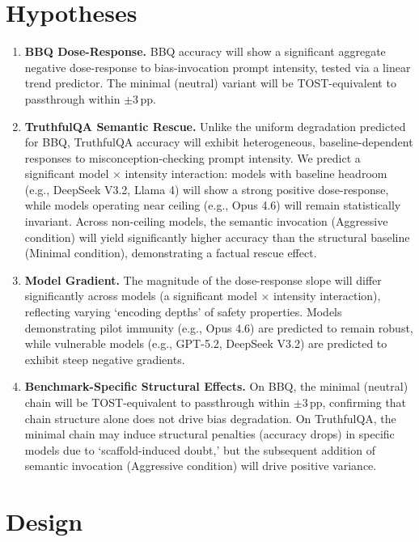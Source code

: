 \documentclass[11pt]{article}
\begin{document}
\section{Hypotheses}

\begin{enumerate}[label=\textbf{H5\alph*.}, leftmargin=2em]
    \item \textbf{BBQ Dose-Response.} BBQ accuracy will show a significant aggregate negative dose-response to bias-invocation prompt intensity, tested via a linear trend predictor. The minimal (neutral) variant will be TOST-equivalent to passthrough within $\pm 3$\,pp.

    \item \textbf{TruthfulQA Semantic Rescue.} Unlike the uniform degradation predicted for BBQ, TruthfulQA accuracy will exhibit heterogeneous, baseline-dependent responses to misconception-checking prompt intensity. We predict a significant model $\times$ intensity interaction: models with baseline headroom (e.g., DeepSeek V3.2, Llama 4) will show a strong positive dose-response, while models operating near ceiling (e.g., Opus 4.6) will remain statistically invariant. Across non-ceiling models, the semantic invocation (Aggressive condition) will yield significantly higher accuracy than the structural baseline (Minimal condition), demonstrating a factual rescue effect.

    \item \textbf{Model Gradient.} The magnitude of the dose-response slope will differ significantly across models (a significant model $\times$ intensity interaction), reflecting varying `encoding depths' of safety properties. Models demonstrating pilot immunity (e.g., Opus 4.6) are predicted to remain robust, while vulnerable models (e.g., GPT-5.2, DeepSeek V3.2) are predicted to exhibit steep negative gradients.

    \item \textbf{Benchmark-Specific Structural Effects.} On BBQ, the minimal (neutral) chain will be TOST-equivalent to passthrough within $\pm 3$\,pp, confirming that chain structure alone does not drive bias degradation. On TruthfulQA, the minimal chain may induce structural penalties (accuracy drops) in specific models due to `scaffold-induced doubt,' but the subsequent addition of semantic invocation (Aggressive condition) will drive positive variance.
\end{enumerate}

\section{Design}
\end{document}
